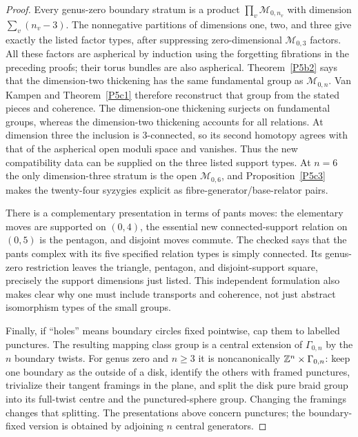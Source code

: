 \begin{proof}
Every genus-zero boundary stratum is a product
$\prod_v\mathcal M_{0,n_v}$ with dimension
$\sum_v(n_v-3)$.  The nonnegative partitions of dimensions one,
two, and three give exactly the listed factor types, after
suppressing zero-dimensional $\mathcal M_{0,3}$ factors.
All these factors are aspherical by induction using the
forgetting fibrations in the preceding proofs; their torus
bundles are also aspherical.  Theorem~\ref{P5b2} says that the
dimension-two thickening has the same fundamental group as
$\mathcal M_{0,n}$.  Van Kampen and
Theorem~\ref{P5c1} therefore reconstruct that group from the
stated pieces and coherence.  The dimension-one thickening
surjects on fundamental groups, whereas the dimension-two
thickening accounts for all relations.  At dimension three
the inclusion is $3$-connected, so its second homotopy agrees
with that of the aspherical open moduli space and vanishes.
Thus the new compatibility data can be supplied on the three
listed support types.  At $n=6$ the only dimension-three
stratum is the open $\mathcal M_{0,6}$, and
Proposition~\ref{P5c3} makes the twenty-four syzygies explicit
as fibre-generator/base-relator pairs.

There is a complementary presentation in terms of pants moves:
the elementary moves are supported on $(0,4)$, the essential
new connected-support relation on $(0,5)$ is the pentagon,
and disjoint moves commute.  The checked \citet[\S2, Theorem 2 and Remark 4, p.~9]{HatcherLochakSchneps2000} says that the pants complex with its five specified relation types is simply connected.  Its
genus-zero restriction leaves the triangle, pentagon, and
disjoint-support square, precisely the support dimensions just
listed.  This independent formulation also makes clear why
one must include transports and coherence, not just abstract
isomorphism types of the small groups.

Finally, if ``holes'' means boundary circles fixed pointwise,
cap them to labelled punctures.  The resulting mapping class
group is a central extension of $\Gamma_{0,n}$ by the $n$
boundary twists.  For genus zero and $n\ge3$ it is noncanonically
$\mathbb Z^n\times\Gamma_{0,n}$: keep one boundary as the outside of
a disk, identify the others with framed punctures, trivialize
their tangent framings in the plane, and split the disk pure
braid group into its full-twist centre and the punctured-sphere
group.  Changing the framings changes that splitting.
The presentations above concern punctures; the boundary-fixed
version is obtained by adjoining $n$ central generators.
\end{proof}
